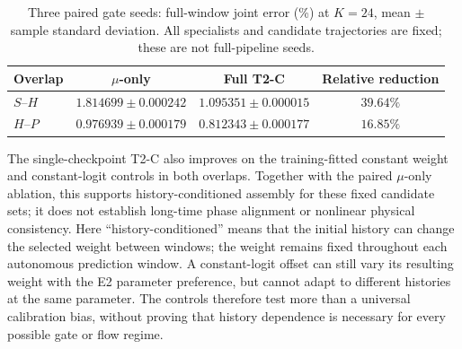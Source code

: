 \begin{table}[H]
\centering
\caption{Three paired gate seeds: full-window joint error (\%) at
$K=24$, mean $\pm$ sample standard deviation. All specialists and
candidate trajectories are fixed; these are not full-pipeline seeds.}
\label{tab:t2c_window_seeds}
\small
\begin{tabular}{@{}lccc@{}}
\toprule
Overlap & $\mu$-only & Full T2-C & Relative reduction\\
\midrule
$S$--$H$ & $1.814699\pm0.000242$ & $1.095351\pm0.000015$ & $39.64\%$\\
$H$--$P$ & $0.976939\pm0.000179$ & $0.812343\pm0.000177$ & $16.85\%$\\
\bottomrule
\end{tabular}
\end{table}

The single-checkpoint T2-C also improves on the training-fitted constant
weight and constant-logit controls in both overlaps. Together with the
paired $\mu$-only ablation, this supports history-conditioned assembly
for these fixed candidate sets; it does not establish long-time phase
alignment or nonlinear physical consistency.
Here ``history-conditioned'' means that the initial history can change
the selected weight between windows; the weight remains fixed throughout
each autonomous prediction window. A constant-logit offset can still
vary its resulting weight with the E2 parameter preference, but cannot
adapt to different histories at the same parameter. The controls therefore
test more than a universal calibration bias, without proving that history
dependence is necessary for every possible gate or flow regime.
